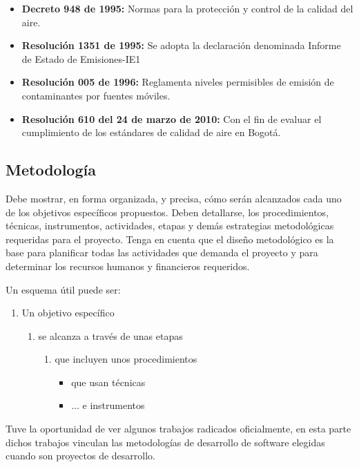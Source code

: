 \documentclass[a4paper, 11pt, oneside]{article}
\theoremstyle{definition}
\theoremstyle{remark}
\begin{document}
\begin{enumerate}[I]
\begin{itemize}
    \item\textbf{Decreto 948 de 1995: } Normas para la protección y control de la 	   calidad del aire.
    \item\textbf{Resolución 1351 de 1995: } Se adopta la declaración denominada 	 Informe de Estado de Emisiones-IE1
    \item\textbf{Resolución 005 de 1996: } Reglamenta niveles permisibles de 		emisión de contaminantes por fuentes móviles.
    \item\textbf{Resolución 610 del 24 de marzo de 2010: } Con el fin de evaluar 	 el cumplimiento de los estándares de calidad de aire en Bogotá.
\end{itemize}
\end{enumerate}
\clearpage


\begin{center}
\section{Metodología}
\end{center}
Debe mostrar, en forma organizada, y precisa, cómo serán alcanzados cada uno de los objetivos
específicos propuestos. Deben detallarse, los procedimientos, técnicas, instrumentos, actividades,
etapas y demás estrategias metodológicas requeridas para el proyecto.  Tenga en cuenta que el
diseño metodológico es la base para planificar todas las actividades que demanda el proyecto y para
determinar los recursos humanos y financieros requeridos.

Un esquema útil puede ser:
\begin{enumerate}
  \item Un objetivo específico
  \begin{enumerate}
    \item se alcanza a través de unas etapas
    \begin{enumerate}
      \item que incluyen unos procedimientos
      \begin{itemize}
        \item que usan técnicas
        \item ... e instrumentos
      \end{itemize}
    \end{enumerate}
  \end{enumerate}
\end{enumerate}

Tuve la oportunidad de ver algunos trabajos radicados oficialmente, en esta parte dichos trabajos
vinculan las metodologías de desarrollo de software elegidas cuando son proyectos de desarrollo.
\clearpage
\end{document}
